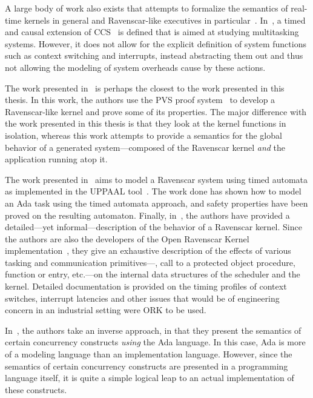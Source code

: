 A large body of work also exists that attempts to formalize the
semantics of real-time kernels in general and Ravenscar-like
executives in particular~\cite{fowler@rtss97, lundqvist@rtcsa99,
  vardanega@rts05, fidge@amast00}. In~\cite{fidge@amast00}, a timed
and causal extension of CCS~\cite{milner-cc} is defined that is aimed
at studying multitasking systems. However, it does not allow for the
explicit definition of system functions such as context switching and
interrupts, instead abstracting them out and thus not allowing the
modeling of system overheads cause by these actions.

The work presented in~\cite{fowler@rtss97} is perhaps the closest to
the work presented in this thesis. In this work, the authors use the
PVS proof system~\cite{owre@cade11} to develop a Ravenscar-like kernel
and prove some of its properties. The major difference with the work
presented in this thesis is that they look at the kernel functions in
isolation, whereas this work attempts to provide a semantics for the
global behavior of a generated system---composed of the Ravenscar
kernel \emph{and} the application running atop it.

The work presented in~\cite{lundqvist@rtcsa99} aims to model a
Ravenscar system using timed automata as implemented in the UPPAAL
tool~\cite{larsen@jsttt97}. The work done has shown how to model an
Ada task using the timed automata approach, and safety properties have
been proved on the resulting automaton. Finally,
in~\cite{vardanega@rts05}, the authors have provided a detailed---yet
informal---description of the behavior of a Ravenscar kernel. Since
the authors are also the developers of the Open Ravenscar Kernel
implementation~\cite{puente@ae00}, they give an exhaustive description
of the effects of various tasking and communication
primitives---, call to a protected object procedure,
function or entry, etc.---on the internal data structures of the
scheduler and the kernel. Detailed documentation is provided on the
timing profiles of context switches, interrupt latencies and other
issues that would be of engineering concern in an industrial setting
were ORK to be used.

In~\cite{peyre@ae07}, the authors take an inverse approach, in that
they present the semantics of certain concurrency constructs
\emph{using} the Ada language. In this case, Ada is more of a modeling
language than an implementation language. However, since the semantics
of certain concurrency constructs are presented in a programming
language itself, it is quite a simple logical leap to an actual
implementation of these constructs.

